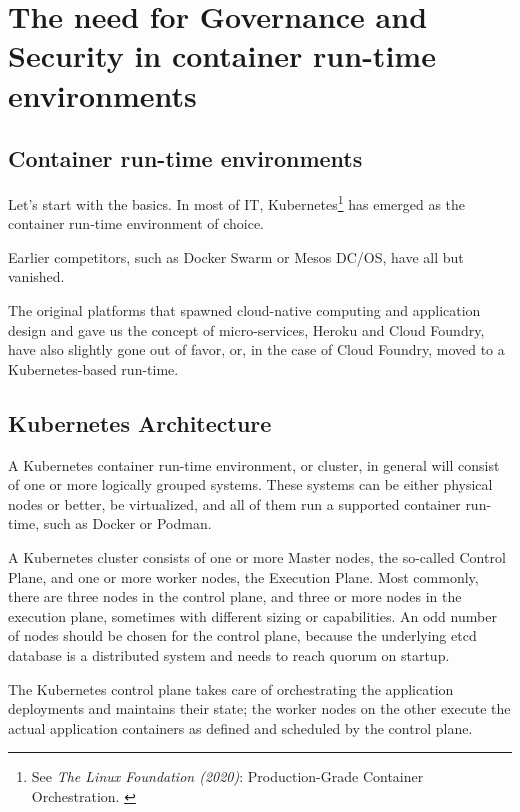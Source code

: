 %
%

\pagebreak
\section{The need for Governance and Security in container run-time environments}

\onehalfspacing

\subsection{Container run-time environments}

Let's start with the basics. In most of IT, Kubernetes\footnote{See \textit{The Linux Foundation (2020)}: Production-Grade Container Orchestration. \cite{kubernetes}} has emerged as the container run-time environment of choice.

Earlier competitors, such as Docker Swarm or Mesos DC/OS, have all but vanished.

The original platforms that spawned cloud-native computing and application design and gave us the concept of micro-services, Heroku and Cloud Foundry, have also slightly gone out of favor, or, in the case of Cloud Foundry, moved to a Kubernetes-based run-time.

\subsection{Kubernetes Architecture}

A Kubernetes container run-time environment, or cluster, in general will consist of one or more logically grouped systems. These systems can be either physical nodes or better, be virtualized, and all of them run a supported container run-time, such as Docker or Podman.

A Kubernetes cluster consists of one or more Master nodes, the so-called Control Plane, and one or more worker nodes, the Execution Plane. Most commonly, there are three nodes in the control plane, and three or more nodes in the execution plane, sometimes with different sizing or capabilities. An odd number of nodes should be chosen for the control plane, because the underlying etcd database is a distributed system and needs to reach quorum on startup.

The Kubernetes control plane takes care of orchestrating the application deployments and maintains their state; the worker nodes on the other execute the actual application containers as defined and scheduled by the control plane.


